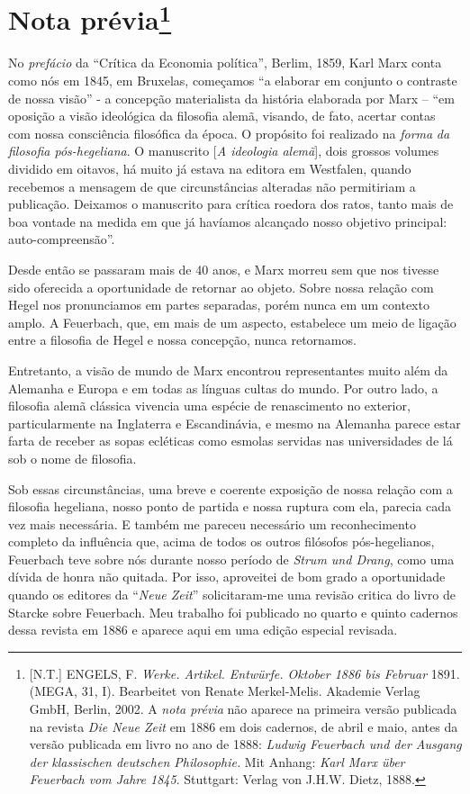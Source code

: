 \chapter{Nota prévia\footnote{{[}N.T.{]} ENGELS, F. \emph{Werke.
  Artikel. Entwürfe. Oktober 1886 bis Februar} 1891. (MEGA, 31, I).
  Bearbeitet von Renate Merkel-Melis. Akademie Verlag GmbH, Berlin,
  2002. A \emph{nota prévia} não aparece na primeira versão publicada na
  revista \emph{Die Neue Zeit} em 1886 em dois cadernos, de abril e
  maio, antes da versão publicada em livro no ano de 1888: \emph{Ludwig
  Feuerbach und der Ausgang der klassischen deutschen Philosophie.} Mit
  Anhang: \emph{Karl Marx über Feuerbach vom Jahre 1845}. Stuttgart:
  Verlag von J.H.W. Dietz, 1888.}}

No \emph{prefácio} da ``Crítica da Economia política'', Berlim, 1859,
Karl Marx conta como nós em 1845, em Bruxelas, começamos ``a elaborar em
conjunto o contraste de nossa visão'' - a concepção materialista da
história elaborada por Marx -- ``em oposição a visão ideológica da
filosofia alemã, visando, de fato, acertar contas com nossa consciência
filosófica da época. O propósito foi realizado na \emph{forma} \emph{da
filosofia pós-hegeliana}. O manuscrito {[}\emph{A ideologia alemã}{]},
dois grossos volumes dividido em oitavos, há muito já estava na editora
em Westfalen, quando recebemos a mensagem de que circunstâncias
alteradas não permitiriam a publicação. Deixamos o manuscrito para
crítica roedora dos ratos, tanto mais de boa vontade na medida em que já
havíamos alcançado nosso objetivo principal: auto-compreensão''.

Desde então se passaram mais de 40 anos, e Marx morreu sem que nos
tivesse sido oferecida a oportunidade de retornar ao objeto. Sobre nossa
relação com Hegel nos pronunciamos em partes separadas, porém nunca em
um contexto amplo. A Feuerbach, que, em mais de um aspecto, estabelece
um meio de ligação entre a filosofia de Hegel e nossa concepção, nunca
retornamos.

Entretanto, a visão de mundo de Marx encontrou representantes muito além
da Alemanha e Europa e em todas as línguas cultas do mundo. Por outro
lado, a filosofia alemã clássica vivencia uma espécie de renascimento no
exterior, particularmente na Inglaterra e Escandinávia, e mesmo na
Alemanha parece estar farta de receber as sopas ecléticas como esmolas
servidas nas universidades de lá sob o nome de filosofia.

Sob essas circunstâncias, uma breve e coerente exposição de nossa
relação com a filosofia hegeliana, nosso ponto de partida e nossa
ruptura com ela, parecia cada vez mais necessária. E também me pareceu
necessário um reconhecimento completo da influência que, acima de todos
os outros filósofos pós-hegelianos, Feuerbach teve sobre nós durante
nosso período de \emph{Strum und Drang}, como uma dívida de honra não
quitada. Por isso, aproveitei de bom grado a oportunidade quando os
editores da ``\emph{Neue Zeit}'' solicitaram-me uma revisão critica do
livro de Starcke sobre Feuerbach. Meu trabalho foi publicado no quarto e
quinto cadernos dessa revista em 1886 e aparece aqui em uma edição
especial revisada.


